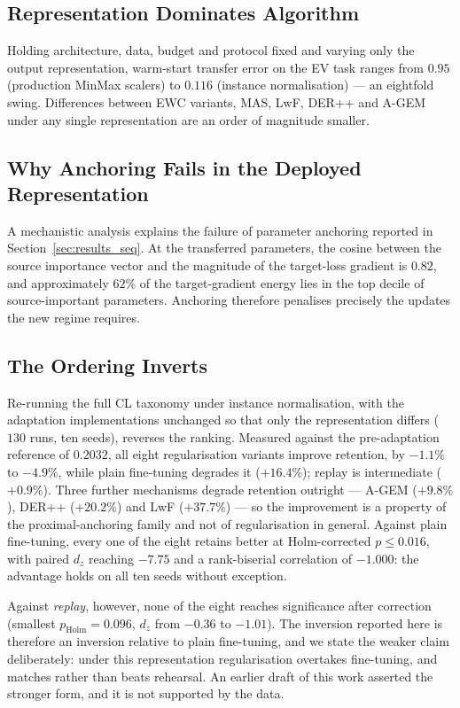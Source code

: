 \documentclass[journal]{IEEEtran}
\begin{document}

\subsection{Representation Dominates Algorithm}
Holding architecture, data, budget and protocol fixed and varying only the
output representation, warm-start transfer error on the EV task ranges from
$0.95$ (production MinMax scalers) to $0.116$ (instance normalisation) --- an
eightfold swing. Differences between EWC variants, MAS, LwF, DER++ and A-GEM
under any single representation are an order of magnitude smaller.

\subsection{Why Anchoring Fails in the Deployed Representation}
A mechanistic analysis explains the failure of parameter anchoring reported in
Section~\ref{sec:results_seq}. At the transferred parameters, the cosine between
the source importance vector and the magnitude of the target-loss gradient is
$0.82$, and approximately $62\%$ of the target-gradient energy lies in the top
decile of source-important parameters. Anchoring therefore penalises precisely
the updates the new regime requires.

\subsection{The Ordering Inverts}
Re-running the full CL taxonomy under instance normalisation, with the
adaptation implementations unchanged so that only the representation differs
($130$ runs, ten seeds), reverses the ranking. Measured against the
pre-adaptation reference of $0.2032$, all eight regularisation variants improve
retention, by $-1.1\%$ to $-4.9\%$, while plain fine-tuning degrades it
($+16.4\%$); replay is intermediate ($+0.9\%$). Three further mechanisms
degrade retention outright --- A-GEM ($+9.8\%$), DER++ ($+20.2\%$) and LwF
($+37.7\%$) --- so the improvement is a property of the proximal-anchoring
family and not of regularisation in general. Against plain fine-tuning, every
one of the eight retains better at Holm-corrected $p \le 0.016$, with paired
$d_z$ reaching $-7.75$ and a rank-biserial correlation of $-1.000$: the
advantage holds on all ten seeds without exception.

Against \emph{replay}, however, none of the eight reaches significance after
correction (smallest $p_{\mathrm{Holm}}{=}0.096$, $d_z$ from $-0.36$ to
$-1.01$). The inversion reported here is therefore an inversion relative to
plain fine-tuning, and we state the weaker claim deliberately: under this
representation regularisation overtakes fine-tuning, and matches rather than
beats rehearsal. An earlier draft of this work asserted the stronger form, and
it is not supported by the data.
\end{document}
